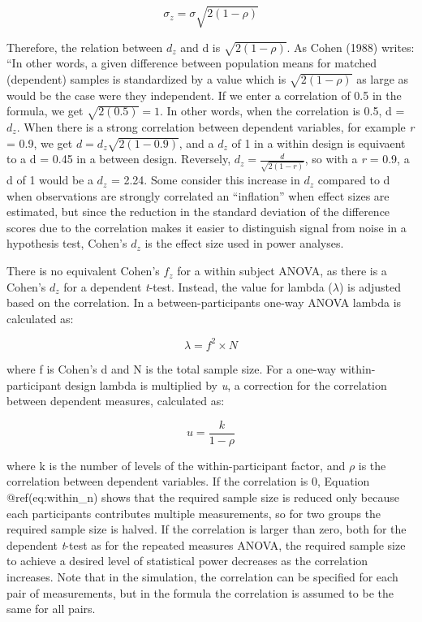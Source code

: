 \documentclass[,man,floatsintext]{apa6}
\begin{document}
\begin{equation}
\sigma_{z}=\sigma\sqrt{2(1-\rho)}
\end{equation}

Therefore, the relation between \(d_z\) and d is \(\sqrt{2(1-\rho)}\).
As Cohen (1988) writes: ``In other words, a given difference between
population means for matched (dependent) samples is standardized by a
value which is \(\sqrt{2(1-\rho)}\) as large as would be the case were
they independent. If we enter a correlation of 0.5 in the formula, we
get \(\sqrt{2(0.5)}=1\). In other words, when the correlation is 0.5, d
= \(d_z\). When there is a strong correlation between dependent
variables, for example \emph{r} = 0.9, we get
\(d=d_{z}\sqrt{2(1-0.9)}\), and a \(d_z\) of 1 in a within design is
equivaent to a d = 0.45 in a between design. Reversely,
\(d_{z}=\frac{d}{\sqrt{2(1-r)}}\), so with a \emph{r} = 0.9, a d of 1
would be a \(d_z\) = 2.24. Some consider this increase in \(d_z\)
compared to d when observations are strongly correlated an
\enquote{inflation} when effect sizes are estimated, but since the
reduction in the standard deviation of the difference scores due to the
correlation makes it easier to distinguish signal from noise in a
hypothesis test, Cohen's \(d_z\) is the effect size used in power
analyses.

There is no equivalent Cohen's \(f_z\) for a within subject ANOVA, as
there is a Cohen's \(d_z\) for a dependent \emph{t}-test. Instead, the
value for lambda (\(\lambda\)) is adjusted based on the correlation. In
a between-participants one-way ANOVA lambda is calculated as:

\begin{equation}
\lambda = f^2 \times N
\end{equation}

where f is Cohen's d and N is the total sample size. For a one-way
within-participant design lambda is multiplied by \emph{u}, a correction
for the correlation between dependent measures, calculated as:

\begin{equation}
u = \frac{k}{1-\rho}
\end{equation}

where k is the number of levels of the within-participant factor, and
\(\rho\) is the correlation between dependent variables. If the
correlation is 0, Equation @ref(eq:within\_n) shows that the required
sample size is reduced only because each participants contributes
multiple measurements, so for two groups the required sample size is
halved. If the correlation is larger than zero, both for the dependent
\emph{t}-test as for the repeated measures ANOVA, the required sample
size to achieve a desired level of statistical power decreases as the
correlation increases. Note that in the simulation, the correlation can
be specified for each pair of measurements, but in the formula the
correlation is assumed to be the same for all pairs.
\end{document}
